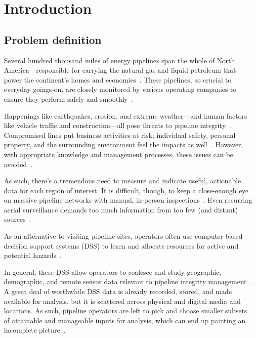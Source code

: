 \chapter{Introduction}
\label{intro}

\section{Problem definition}
\label{Problem}
Several hundred thousand miles of energy pipelines span the whole of North America---responsible for carrying the natural gas and liquid petroleum that power the continent's homes and economies~\cite{PHMSA}. These pipelines, so crucial to everyday goings-on, are closely monitored by various operating companies to ensure they perform safely and smoothly~\cite{PHMSA2013}.

Happenings like earthquakes, erosion, and extreme weather---and human factors like vehicle traffic and construction---all pose threats to pipeline integrity~\cite{MichaelBakerJr.2008,Chastain,Dunning2013}. Compromised lines put business activities at risk; individual safety, personal property, and the surrounding environment feel the impacts as well~\cite{Dunning2013}. However, with appropriate knowledge and management processes, these issues can be avoided~\cite{Dunning2013,Chastain}.

As such, there's a tremendous need to measure and indicate useful, actionable data for each region of interest. It is difficult, though, to keep a close-enough eye on massive pipeline networks with manual, in-person inspections~\cite{Dunning2013,Chastain}. Even recurring aerial surveillance demands too much information from too few (and distant) sources~\cite{Dunning2013}.

As an alternative to visiting pipeline sites, operators often use computer-based decision support systems (DSS) to learn and allocate resources for active and potential hazards~\cite{PHMSA2013,Dunning2013}. 

In general, these DSS allow operators to coalesce and study geographic, demographic, and remote sensor data relevant to pipeline integrity management~\cite{RedlandsSDSS,Dunning2013}. A great deal of worthwhile DSS data is already recorded, stored, and made available for analysis, but it is scattered across physical and digital media and locations. As such, pipeline operators are left to pick and choose smaller subsets of attainable and manageable inputs for analysis, which can end up painting an incomplete picture~\cite{Dunning2013}.

